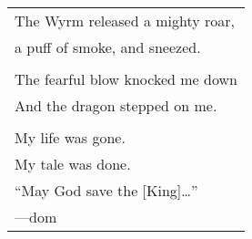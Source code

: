 \documentclass{article}
\begin{document}
\begin{center}
\begin{tabular}{l}
\\
The Wyrm released a mighty roar, \\
a puff of smoke, and sneezed. \\
\\
The fearful blow knocked me down \\
And the dragon stepped on me. \\
\\
My life was gone. \\
My tale was done. \\
``May God save the [King]\ldots{}'' \\
---dom \\
\end{tabular}
\end{center}
\end{document}
